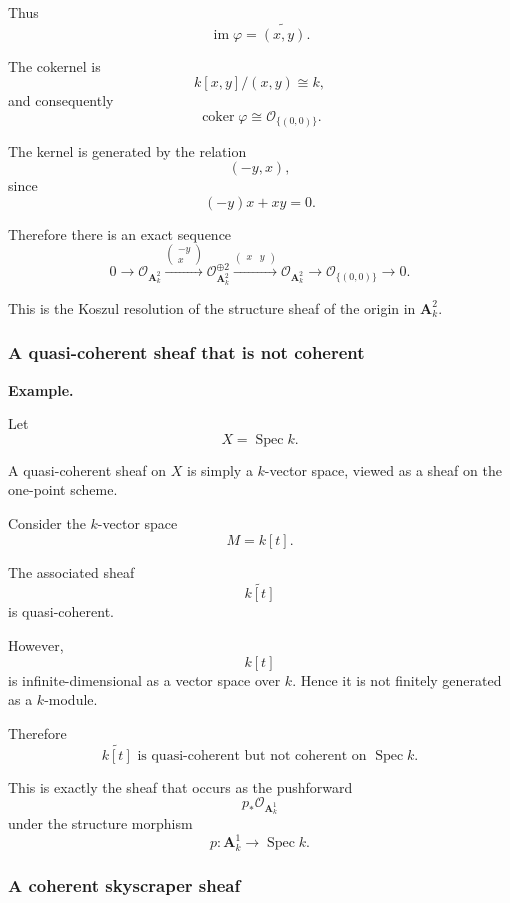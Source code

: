 \documentclass[12pt,a4paper]{article}
\theoremstyle{notespace}
\begin{document}
Thus
\[
\operatorname{im}\varphi=\widetilde{(x,y)}.
\]

The cokernel is
\[
k[x,y]/(x,y)\cong k,
\]
and consequently
\[
\operatorname{coker}\varphi
\cong
\mathcal O_{\{(0,0)\}}.
\]

The kernel is generated by the relation
\[
(-y,x),
\]
since
\[
(-y)x+xy=0.
\]

Therefore there is an exact sequence
\[
0
\longrightarrow
\mathcal O_{\mathbf A^2_k}
\xrightarrow{
	\begin{pmatrix}
		-y\\
		x
	\end{pmatrix}
}
\mathcal O_{\mathbf A^2_k}^{\oplus 2}
\xrightarrow{
	\begin{pmatrix}
		x & y
	\end{pmatrix}
}
\mathcal O_{\mathbf A^2_k}
\longrightarrow
\mathcal O_{\{(0,0)\}}
\longrightarrow
0.
\]

This is the Koszul resolution of the structure sheaf of the origin in \(\mathbf A^2_k\).

\subsubsection{A quasi-coherent sheaf that is not coherent}

\textbf{Example.}

Let
\[
X=\operatorname{Spec}k.
\]

A quasi-coherent sheaf on \(X\) is simply a \(k\)-vector space, viewed as a sheaf on the one-point scheme.

Consider the \(k\)-vector space
\[
M=k[t].
\]

The associated sheaf
\[
\widetilde{k[t]}
\]
is quasi-coherent.

However,
\[
k[t]
\]
is infinite-dimensional as a vector space over \(k\). Hence it is not finitely generated as a \(k\)-module.

Therefore
\[
\boxed{
	\widetilde{k[t]}
	\text{ is quasi-coherent but not coherent on }\operatorname{Spec}k.
}
\]

This is exactly the sheaf that occurs as the pushforward
\[
p_*\mathcal O_{\mathbf A^1_k}
\]
under the structure morphism
\[
p:\mathbf A^1_k\longrightarrow\operatorname{Spec}k.
\]

\subsubsection{A coherent skyscraper sheaf}
\end{document}
